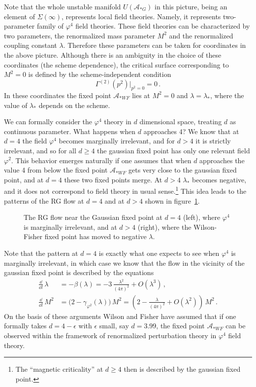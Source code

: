 Note that the whole unstable manifold $U(\mathcal A_{*G})$ in this picture, being
an element of $\Sigma(\infty)$, represents local field theories. Namely, it
represents two-parameter family of $\varphi^4$ field theories. These field
theories can be characterized by two parameters, the renormalized mass parameter
$M^2$ and the renormalized coupling constant $\lambda$. Therefore these parameters
can be taken for coordinates in the above picture. Although there is an ambiguity
in the choice of these coordinates (the scheme dependence), the critical surface
corresponding to $M^2=0$ is defined by the scheme-independent condition
\begin{equation}\label{eq:masslesscond}
\Gamma^{(2)}(p^2)\big|_{p^2=0}=0\,.
\end{equation}
In these coordinates the fixed point $\mathcal A_{*WF}$ lies at $M^2=0$ and
$\lambda=\lambda_*$, where the value of $\lambda_*$ depends on the scheme.

We can formally consider the $\varphi^4$ theory in $d$ dimensional space, treating
$d$ as continuous parameter. What happens when $d$ approaches 4? We know that at
$d=4$ the field $\varphi^4$ becomes marginally irrelevant, and for $d>4$ it is
strictly irrelevant, and so for all $d\ge4$ the gaussian fixed point has only one
relevant field $\varphi^2$. This behavior emerges naturally if one assumes that
when $d$ approaches the value 4 from below the fixed point $\mathcal A_{*WF}$ gets
very close to the gaussian fixed point, and at $d=4$ these two fixed points merge.
At $d>4$ $\lambda_*$ becomes negative, and it does not correspond to field theory
in usual sense.\footnote{The ``magnetic criticality'' at $d\ge4$ then is described
by the gaussian fixed point.} This idea leads to the patterns of the RG flow at
$d=4$ and at $d>4$ shown in figure~\ref{fig:wfmerge}.
\begin{figure}[ht]
\centering{}
\caption{The RG flow near the Gaussian fixed point at $d=4$ (left), where
$\varphi^4$ is marginally irrelevant, and at $d>4$ (right), where the
Wilson-Fisher fixed point has moved to negative $\lambda$.}
\label{fig:wfmerge}
\end{figure}

Note that the pattern at $d=4$ is exactly what one expects to see when $\varphi^4$
is marginally irrelevant, in which case we know that the flow in the vicinity of
the gaussian fixed point is described by the equations
\begin{align*}
\frac{\dd}{\dd l}\,\lambda&=-\beta(\lambda)=-3\,\frac{\lambda^2}{(4\pi)^2}+O(\lambda^3)\,,\\
\frac{\dd}{\dd l}\,M^2&=\bigl(2-\gamma_{\varphi^2}(\lambda)\bigr)\,M^2=\left(2-\frac\lambda{(4\pi)^2}+O(\lambda^2)\right)\,M^2\,.
\end{align*}
On the basis of these arguments Wilson and Fisher have assumed that if one
formally takes $d=4-\epsilon$ with $\epsilon$ small, say $d=3.99$, the fixed point
$\mathcal A_{*WF}$ can be observed within the framework of renormalized
perturbation theory in $\varphi^4$ field theory.

